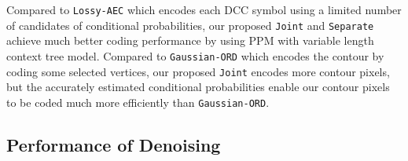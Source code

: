 Compared to \texttt{Lossy-AEC} which encodes each DCC symbol using a limited number of candidates of conditional probabilities, our proposed \texttt{Joint} and \texttt{Separate} achieve much better coding performance by using PPM with variable length context tree model.
Compared to \texttt{Gaussian-ORD} which encodes the contour by coding some selected vertices, our proposed \texttt{Joint} encodes more contour pixels, but the accurately estimated conditional probabilities enable our contour pixels to be coded much more efficiently than \texttt{Gaussian-ORD}.

\subsection{Performance of Denoising}
\label{subsec:Denoising_performance}



